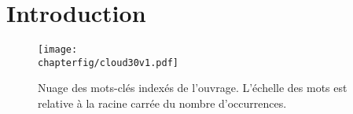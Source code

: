 \chapter{Introduction}\label{chap:in}

\renewcommand\chapterpath{Main/Intro}
\renewcommand\chapterfig{Main/Intro/Figures}

\vfill
\begin{figure*}[!ht]
    \centering
    \texttt{[image: \\chapterfig/cloud30v1.pdf]}
    \caption{Nuage des mots-clés indexés de l'ouvrage. L'échelle des mots est relative à la racine carrée du nombre d'occurrences.}
\end{figure*}
\vfill
\pagebreak




